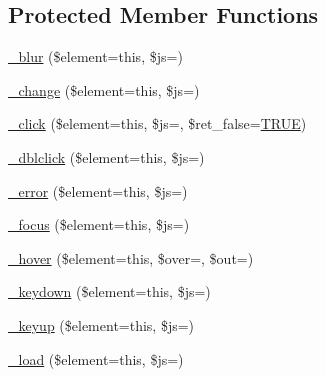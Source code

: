 \subsection*{Protected Member Functions}
\begin{DoxyCompactItemize}
\item 
\mbox{\hyperlink{class_c_i___jquery_a1bb775476cdb3626681116886d245c2c}{\+\_\+blur}} (\$element=\textquotesingle{}this\textquotesingle{}, \$js=\textquotesingle{}\textquotesingle{})
\item 
\mbox{\hyperlink{class_c_i___jquery_abcb287d50d267968e11a1cb63637bfbb}{\+\_\+change}} (\$element=\textquotesingle{}this\textquotesingle{}, \$js=\textquotesingle{}\textquotesingle{})
\item 
\mbox{\hyperlink{class_c_i___jquery_a39604f0f7f540f32ea0c552e58322b5f}{\+\_\+click}} (\$element=\textquotesingle{}this\textquotesingle{}, \$js=\textquotesingle{}\textquotesingle{}, \$ret\+\_\+false=\mbox{\hyperlink{constants_8php_ae04a3efe6aa42044f803ee90c2277846}{T\+R\+UE}})
\item 
\mbox{\hyperlink{class_c_i___jquery_a0bf9741d68eb375f18c29b49dec6f984}{\+\_\+dblclick}} (\$element=\textquotesingle{}this\textquotesingle{}, \$js=\textquotesingle{}\textquotesingle{})
\item 
\mbox{\hyperlink{class_c_i___jquery_a8731ec925abaf39ed5e8635365c6512d}{\+\_\+error}} (\$element=\textquotesingle{}this\textquotesingle{}, \$js=\textquotesingle{}\textquotesingle{})
\item 
\mbox{\hyperlink{class_c_i___jquery_a793f87a37e811242a5fca42f4c242dd8}{\+\_\+focus}} (\$element=\textquotesingle{}this\textquotesingle{}, \$js=\textquotesingle{}\textquotesingle{})
\item 
\mbox{\hyperlink{class_c_i___jquery_a4d4b0aa0172ff0130de5ffb607a646fa}{\+\_\+hover}} (\$element=\textquotesingle{}this\textquotesingle{}, \$over=\textquotesingle{}\textquotesingle{}, \$out=\textquotesingle{}\textquotesingle{})
\item 
\mbox{\hyperlink{class_c_i___jquery_a30ac9d85c27478608dc702add9fae74a}{\+\_\+keydown}} (\$element=\textquotesingle{}this\textquotesingle{}, \$js=\textquotesingle{}\textquotesingle{})
\item 
\mbox{\hyperlink{class_c_i___jquery_a8671a9d5ea385d65bc6c7ff4b577adfe}{\+\_\+keyup}} (\$element=\textquotesingle{}this\textquotesingle{}, \$js=\textquotesingle{}\textquotesingle{})
\item 
\mbox{\hyperlink{class_c_i___jquery_a24c1ddb2247d180ca74532e991afd4f6}{\+\_\+load}} (\$element=\textquotesingle{}this\textquotesingle{}, \$js=\textquotesingle{}\textquotesingle{})

\end{DoxyCompactItemize}
